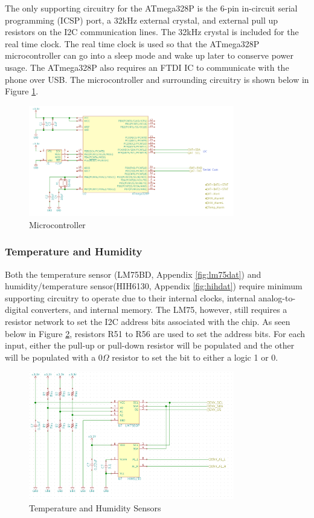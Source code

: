 \documentclass{article}
\numberwithin{figure}{section}
\numberwithin{equation}{section}
\begin{document}
{The only supporting circuitry for the ATmega328P is the 6-pin in-circuit serial programming (ICSP) port, a 32kHz external crystal, and external pull up resistors on the I2C communication lines. The 32kHz crystal is included for the real time clock. The real time clock is used so that the ATmega328P microcontroller can go into a sleep mode and wake up later to conserve power usage. The ATmega328P also requires an FTDI IC to communicate with the phone over USB. The microcontroller and surrounding circuitry is shown below in Figure \ref{fig:mcu}.
\begin{figure}[H]
	\centering
	\includegraphics[width=0.8\textwidth]{Microcontroller}
	\caption{Microcontroller}
	\label{fig:mcu}
\end{figure}

\subsubsection{Temperature and Humidity}

Both the temperature sensor (LM75BD, Appendix \ref{fig:lm75dat}) and humidity/temperature sensor(HIH6130, Appendix \ref{fig:hihdat}) require minimum supporting circuitry to operate due to their internal clocks, internal analog-to-digital converters, and internal memory. The LM75, however, still requires a resistor network to set the I2C address bits associated with the chip. As seen below in Figure \ref{fig:tandh}, resistors R51 to R56 are used to set the address bits. For each input, either the pull-up or pull-down resistor will be populated and the other will be populated with a 0$\Omega$ resistor to set the bit to either a logic 1 or 0.

\begin{figure}[H]
	\centering
	\includegraphics[width=0.8\textwidth]{temphumid}
	\caption{Temperature and Humidity Sensors}
	\label{fig:tandh}
\end{figure}

}
\end{document}
